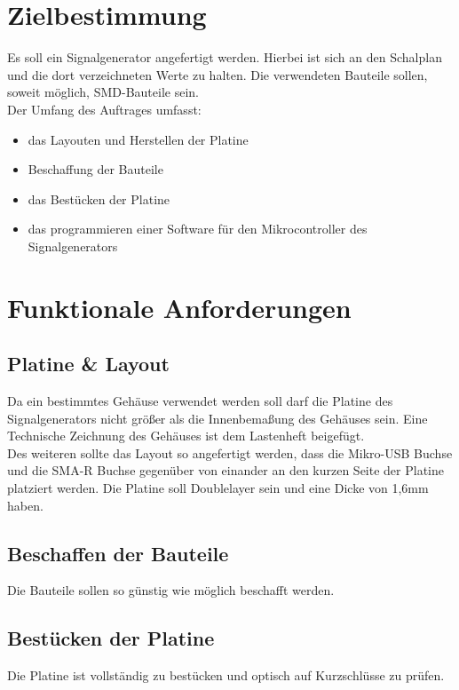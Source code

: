 \section{Zielbestimmung}
Es soll ein Signalgenerator angefertigt werden. Hierbei ist sich an den Schalplan und die dort verzeichneten Werte zu halten.
Die verwendeten Bauteile sollen, soweit möglich, SMD-Bauteile sein.\\
Der Umfang des Auftrages umfasst:
\begin{itemize}
\item{das Layouten und Herstellen der Platine}
\item{Beschaffung der Bauteile}
\item{das Bestücken der Platine}
\item{das programmieren einer Software für den Mikrocontroller des Signalgenerators}
\end{itemize}

\section{Funktionale Anforderungen}

\subsection{Platine \& Layout}

Da ein bestimmtes Gehäuse verwendet werden soll darf die Platine des Signalgenerators nicht größer als
die Innenbemaßung des Gehäuses sein. Eine Technische Zeichnung des Gehäuses ist dem Lastenheft beigefügt.\\
Des weiteren sollte das Layout so angefertigt werden, dass die Mikro-USB Buchse und die SMA-R Buchse gegenüber
von einander an den kurzen Seite der Platine platziert werden.
Die Platine soll Doublelayer sein und eine Dicke von 1,6mm haben.

\subsection{Beschaffen der Bauteile}

Die Bauteile sollen so günstig wie möglich beschafft werden. 

\subsection{Bestücken der Platine}

Die Platine ist vollständig zu bestücken und optisch auf Kurzschlüsse zu prüfen.

